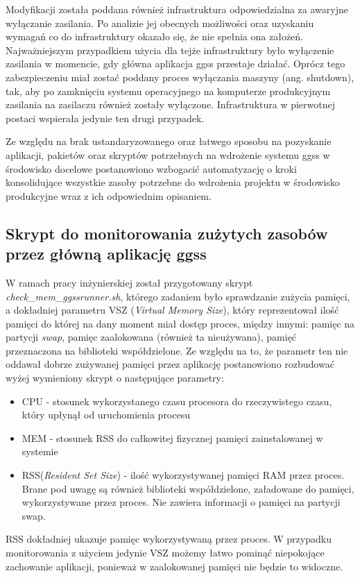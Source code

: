 Modyfikacji została poddana również infrastruktura odpowiedzialna za awaryjne wyłączanie zasilania. Po analizie jej obecnych możliwości oraz uzyskaniu wymagań co do infrastruktury okazało się, że nie spełnia ona założeń. Najważniejszym przypadkiem użycia dla tejże infrastruktury było wyłączenie zasilania w momencie, gdy główna aplikacja ggss przestaje działać. Oprócz tego zabezpieczeniu miał zostać poddany proces wyłączania maszyny (ang. shutdown), tak, aby po zamknięciu systemu operacyjnego na komputerze produkcyjnym zasilania na zasilaczu również zostały wyłączone. Infrastruktura w pierwotnej postaci wspierała jedynie ten drugi przypadek.

Ze względu na brak ustandaryzowanego oraz łatwego sposobu na pozyskanie aplikacji, pakietów oraz skryptów potrzebnych na wdrożenie systemu ggss w środowisko docelowe postanowiono wzbogacić automatyzację o kroki konsolidujące wszystkie zasoby potrzebne do wdrożenia projektu w środowisko produkcyjne wraz z ich odpowiednim opisaniem.

\subsection{Skrypt do monitorowania zużytych zasobów przez główną aplikację ggss}

W ramach pracy inżynierskiej został przygotowany skrypt \emph{check\_mem\_ggssrunner.sh}, którego zadaniem było sprawdzanie zużycia pamięci, a dokładniej parametru VSZ (\emph{Virtual Memory Size}), który reprezentował ilość pamięci do której na dany moment miał dostęp proces, między innymi: pamięc na partycji \emph{swap}, pamięc zaalokowana (również ta nieużywana), pamięć przeznaczona na biblioteki współdzielone. Ze względu na to, że parametr ten nie oddawał dobrze zużywanej pamięci przez aplikację postanowiono rozbudować wyżej wymieniony skrypt o następujące parametry:
\begin{itemize}
    \item CPU - stosunek wykorzystanego czasu procesora do rzeczywistego czasu, który upłynął od uruchomienia procesu
    \item MEM - stosunek RSS do całkowitej fizycznej pamięci zainstalowanej w systemie
    \item RSS(\emph{Resident Set Size}) - ilość wykorzystywanej pamięci RAM przez proces. Brane pod uwagę są również biblioteki współdzielone, załadowane do pamięci, wykorzystywane przez proces. Nie zawiera informacji o pamięci na partycji swap.
\end{itemize}
RSS dokładniej ukazuje pamięc wykorzystywaną przez proces. W przypadku monitorowania z użyciem jedynie VSZ możemy łatwo pominąć niepokojące zachowanie aplikacji, ponieważ w zaalokowanej pamięci nie będzie to widoczne.

